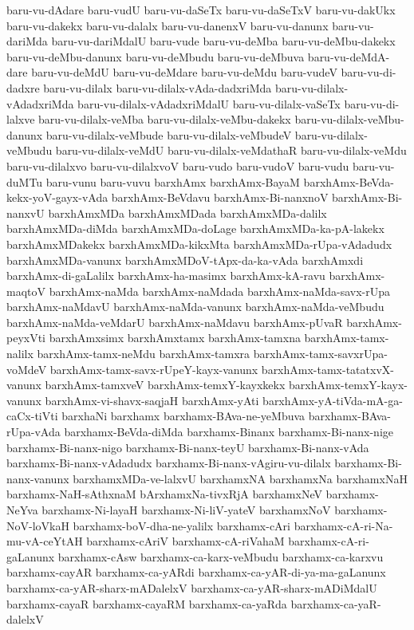 {baru-vu-dAdare
baru-vudU
baru-vu-daSeTx
baru-vu-daSeTxV
baru-vu-dakUkx
baru-vu-dakekx
baru-vu-dalalx
baru-vu-danenxV
baru-vu-danunx
baru-vu-dariMda
baru-vu-dariMdalU
baru-vude
baru-vu-deMba
baru-vu-deMbu-dakekx
baru-vu-deMbu-danunx
baru-vu-deMbudu
baru-vu-deMbuva
baru-vu-deMdA-dare
baru-vu-deMdU
baru-vu-deMdare
baru-vu-deMdu
baru-vudeV
baru-vu-di-dadxre
baru-vu-dilalx
baru-vu-dilalx-vAda-dadxriMda
baru-vu-dilalx-vAdadxriMda
baru-vu-dilalx-vAdadxriMdalU
baru-vu-dilalx-vaSeTx
baru-vu-di-lalxve
baru-vu-dilalx-veMba
baru-vu-dilalx-veMbu-dakekx
baru-vu-dilalx-veMbu-danunx
baru-vu-dilalx-veMbude
baru-vu-dilalx-veMbudeV
baru-vu-dilalx-veMbudu
baru-vu-dilalx-veMdU
baru-vu-dilalx-veMdathaR
baru-vu-dilalx-veMdu
baru-vu-dilalxvo
baru-vu-dilalxvoV
baru-vudo
baru-vudoV
baru-vudu
baru-vu-duMTu
baru-vunu
baru-vuvu
barxhAmx
barxhAmx-BayaM
barxhAmx-BeVda-kekx-yoV-gayx-vAda
barxhAmx-BeVdavu
barxhAmx-Bi-nanxnoV
barxhAmx-Bi-nanxvU
barxhAmxMDa
barxhAmxMDada
barxhAmxMDa-dalilx
barxhAmxMDa-diMda
barxhAmxMDa-doLage
barxhAmxMDa-ka-pA-lakekx
barxhAmxMDakekx
barxhAmxMDa-kikxMta
barxhAmxMDa-rUpa-vAdadudx
barxhAmxMDa-vanunx
barxhAmxMDoV-tApx-da-ka-vAda
barxhAmxdi
barxhAmx-di-gaLalilx
barxhAmx-ha-masimx
barxhAmx-kA-ravu
barxhAmx-maqtoV
barxhAmx-naMda
barxhAmx-naMdada
barxhAmx-naMda-savx-rUpa
barxhAmx-naMdavU
barxhAmx-naMda-vanunx
barxhAmx-naMda-veMbudu
barxhAmx-naMda-veMdarU
barxhAmx-naMdavu
barxhAmx-pUvaR
barxhAmx-peyxVti
barxhAmxsimx
barxhAmxtamx
barxhAmx-tamxna
barxhAmx-tamx-nalilx
barxhAmx-tamx-neMdu
barxhAmx-tamxra
barxhAmx-tamx-savxrUpa-voMdeV
barxhAmx-tamx-savx-rUpeY-kayx-vanunx
barxhAmx-tamx-tatatxvX-vanunx
barxhAmx-tamxveV
barxhAmx-temxY-kayxkekx
barxhAmx-temxY-kayx-vanunx
barxhAmx-vi-shavx-saqjaH
barxhAmx-yAti
barxhAmx-yA-tiVda-mA-ga-caCx-tiVti
barxhaNi
barxhamx
barxhamx-BAva-ne-yeMbuva
barxhamx-BAva-rUpa-vAda
barxhamx-BeVda-diMda
barxhamx-Binanx
barxhamx-Bi-nanx-nige
barxhamx-Bi-nanx-nigo
barxhamx-Bi-nanx-teyU
barxhamx-Bi-nanx-vAda
barxhamx-Bi-nanx-vAdadudx
barxhamx-Bi-nanx-vAgiru-vu-dilalx
barxhamx-Bi-nanx-vanunx
barxhamxMDa-ve-lalxvU
barxhamxNA
barxhamxNa
barxhamxNaH
barxhamx-NaH-sAthxnaM
bArxhamxNa-tivxRjA
barxhamxNeV
barxhamx-NeYva
barxhamx-Ni-layaH
barxhamx-Ni-liV-yateV
barxhamxNoV
barxhamx-NoV-loVkaH
barxhamx-boV-dha-ne-yalilx
barxhamx-cAri
barxhamx-cA-ri-Na-mu-vA-ceYtAH
barxhamx-cAriV
barxhamx-cA-riVahaM
barxhamx-cA-ri-gaLanunx
barxhamx-cAsw
barxhamx-ca-karx-veMbudu
barxhamx-ca-karxvu
barxhamx-cayAR
barxhamx-ca-yARdi
barxhamx-ca-yAR-di-ya-ma-gaLanunx
barxhamx-ca-yAR-sharx-mADalelxV
barxhamx-ca-yAR-sharx-mADiMdalU
barxhamx-cayaR
barxhamx-cayaRM
barxhamx-ca-yaRda
barxhamx-ca-yaR-dalelxV
}
